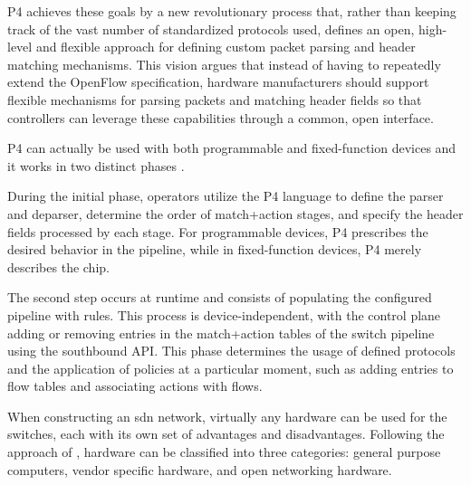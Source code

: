 P4 achieves these goals by a new revolutionary process that, rather than keeping track of the vast number of standardized protocols used, defines an open, high-level and flexible approach for defining custom packet parsing and header matching mechanisms. This vision argues that instead of having to repeatedly extend the OpenFlow specification, hardware manufacturers should support flexible mechanisms for parsing packets and matching header fields so that controllers can leverage these capabilities through a common, open interface. \cite{bosshart_p4_2014}

P4 can actually be used with both programmable and fixed-function devices\cite{peterson_software-defined_2021} and it works in two distinct phases \cite{bosshart_p4_2014}\cite{bifulco_survey_2018}. 

During the initial phase, operators utilize the P4 language to define the parser and deparser, determine the order of match+action stages, and specify the header fields processed by each stage. For programmable devices, P4 prescribes the desired behavior in the pipeline, while in fixed-function devices, P4 merely describes the chip. 

The second step occurs at runtime and consists of populating the configured pipeline with rules. This process is device-independent, with the control plane adding or removing entries in the match+action tables of the switch pipeline using the southbound API. This phase determines the usage of defined protocols and the application of policies at a particular moment, such as adding entries to flow tables and associating actions with flows.

When constructing an \gls{sdn} network, virtually any hardware can be used for the switches, each with its own set of advantages and disadvantages. Following the approach of \cite{xia_survey_2015}, hardware can be classified into three categories: general purpose computers, vendor specific hardware, and open networking hardware. 

